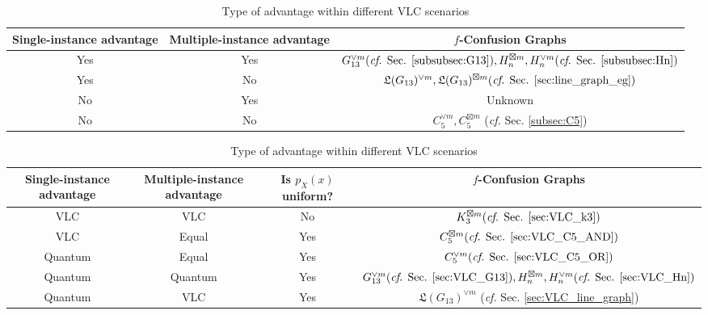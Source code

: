 \documentclass[journal, onecolumn, draftcls]{IEEEtran}
\theoremstyle{definition}
\newcommand{\frL}{\mathfrak{L}}
\newcommand{\meng}[1]{\marginpar{+}{\bf Ruoyu's remark}: {\em #1}}
\newcommand{\aditya}[1]{\marginpar{+}{\bf Aditya's remark}: {\em #1}}
\begin{document}
\begin{table}[t]   %
    \centering %
    \caption{Quantum advantage within different FLC scenarios} %
    \label{table:Main_contribution}
    \begin{tabular}{|c|c|c|}
        \hline
        Single-instance advantage & Multiple-instance advantage & $f$-Confusion Graphs \\
        \hline
        Yes    & Yes   & $G_{13}^{\lor m} \text{({\it cf.} Sec. \ref{subsubsec:G13})},H_n^{\boxtimes m},H_n^{\lor m} \text{({\it cf.} Sec. \ref{subsubsec:Hn})}$ \\
        \hline
        Yes    & No   & $\frL(G_{13})^{\lor m},\frL(G_{13})^{\boxtimes m} \text{({\it cf.} Sec. \ref{sec:line_graph_eg})}$ \\
        \hline
        No    & Yes   & Unknown \\
        \hline
        No    & No   & $C_5^{\lor m},C_5^{\boxtimes m}$ ({\it cf.} Sec. \ref{subsec:C5})\\
        \hline
    \end{tabular}
    \vspace{5mm}
    \caption{Type of advantage within different VLC scenarios}\label{table:VLC}
    \begin{tabular}{|c|c|c|c|}
        \hline
        Single-instance advantage & Multiple-instance advantage & Is $p_X(x)$ uniform? & $f$-Confusion Graphs   \\
        \hline
        VLC    & VLC & No  & $K_3^{\boxtimes m}  \text{({\it cf.} Sec. \ref{sec:VLC_k3})}$   \\ 
        \hline
          VLC  & Equal   & Yes  & $C_5^{\boxtimes m} \text{({\it cf.} Sec. \ref{sec:VLC_C5_AND})}$ \\
        \hline
         Quantum   & Equal & Yes  & $C_5^{\lor m} \text{({\it cf.} Sec. \ref{sec:VLC_C5_OR})}$ \\
        \hline
        Quantum    & Quantum & Yes  & $G_{13}^{\lor m} \text{({\it cf.} Sec. \ref{sec:VLC_G13})}, H_n^{\boxtimes m},H_n^{\lor m} \text{({\it cf.} Sec. \ref{sec:VLC_Hn})}$ \\
        \hline
        Quantum    & VLC & Yes  & $\frL(G_{13})^{\lor m}$ ({\it cf.} Sec. \ref{sec:VLC_line_graph})\\
        \hline
    \end{tabular}
\end{table}
\end{document}

